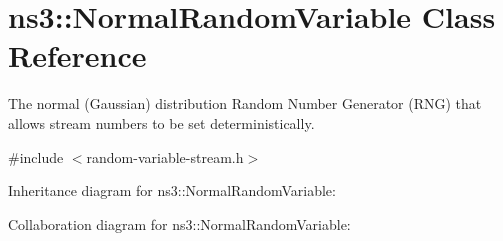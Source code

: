 \hypertarget{classns3_1_1NormalRandomVariable}{}\section{ns3\+:\+:Normal\+Random\+Variable Class Reference}
\label{classns3_1_1NormalRandomVariable}


The normal (Gaussian) distribution Random Number Generator (R\+NG) that allows stream numbers to be set deterministically.  




{\ttfamily \#include $<$random-\/variable-\/stream.\+h$>$}



Inheritance diagram for ns3\+:\+:Normal\+Random\+Variable\+:


Collaboration diagram for ns3\+:\+:Normal\+Random\+Variable\+:
